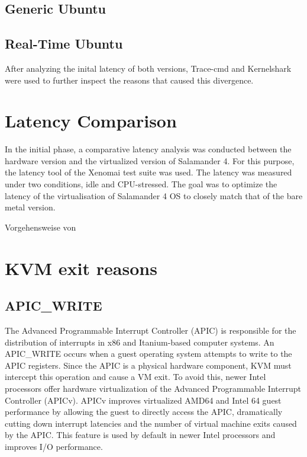 \documentclass[MMR,Master,english]{twbook}
\begin{document}
\subsection{Generic Ubuntu}
\clearpage
\subsection{Real-Time Ubuntu}


After analyzing the inital latency of both versions, Trace-cmd and Kernelshark were used to further inspect the reasons that caused this divergence.


\clearpage
\section{Latency Comparison}
In the initial phase, a comparative latency analysis was conducted between the hardware version and the virtualized version of Salamander 4. For this purpose, the latency tool of the Xenomai test suite was used. The latency was measured under two conditions, idle and CPU-stressed. The goal was to optimize the latency of the virtualisation of Salamander 4 OS to closely match that of the bare metal version.

Vorgehensweise von \cite{linPerformanceEvaluationXenomai}

\clearpage
\section{KVM exit reasons}\label{sec:kvm_exit_reasons}
\subsection{APIC\_WRITE}

The Advanced Programmable Interrupt Controller (APIC) is responsible for the distribution of interrupts in x86 and Itanium-based computer systems. An APIC\_WRITE occurs when a guest operating system attempts to write to the APIC registers. Since the APIC is a physical hardware component, KVM must intercept this operation and cause a VM exit. To avoid this, newer Intel processors offer hardware virtualization of the Advanced Programmable Interrupt Controller (APICv). APICv improves virtualized AMD64 and Intel 64 guest performance by allowing the guest to directly access the APIC, dramatically cutting down interrupt latencies and the number of virtual machine exits caused by the APIC. This feature is used by default in newer Intel processors and improves I/O performance. 
\end{document}
